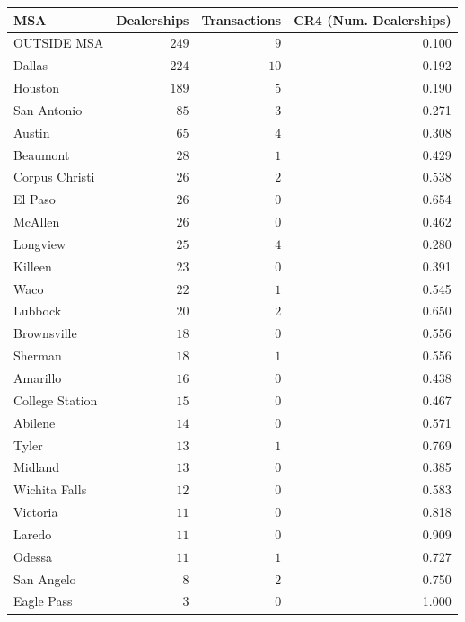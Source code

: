 \begin{tabular}{lrrr}
\toprule
MSA & Dealerships & Transactions & CR4 (Num. Dealerships) \\
\midrule
OUTSIDE MSA & $249$ & $9$ & 0.100 \\
Dallas & $224$ & $10$ & 0.192 \\
Houston & $189$ & $5$ & 0.190 \\
San Antonio & $85$ & $3$ & 0.271 \\
Austin & $65$ & $4$ & 0.308 \\
Beaumont & $28$ & $1$ & 0.429 \\
Corpus Christi & $26$ & $2$ & 0.538 \\
El Paso & $26$ & $0$ & 0.654 \\
McAllen & $26$ & $0$ & 0.462 \\
Longview & $25$ & $4$ & 0.280 \\
Killeen & $23$ & $0$ & 0.391 \\
Waco & $22$ & $1$ & 0.545 \\
Lubbock & $20$ & $2$ & 0.650 \\
Brownsville & $18$ & $0$ & 0.556 \\
Sherman & $18$ & $1$ & 0.556 \\
Amarillo & $16$ & $0$ & 0.438 \\
College Station & $15$ & $0$ & 0.467 \\
Abilene & $14$ & $0$ & 0.571 \\
Tyler & $13$ & $1$ & 0.769 \\
Midland & $13$ & $0$ & 0.385 \\
Wichita Falls & $12$ & $0$ & 0.583 \\
Victoria & $11$ & $0$ & 0.818 \\
Laredo & $11$ & $0$ & 0.909 \\
Odessa & $11$ & $1$ & 0.727 \\
San Angelo & $8$ & $2$ & 0.750 \\
Eagle Pass & $3$ & $0$ & 1.000 \\
\bottomrule
\end{tabular}
